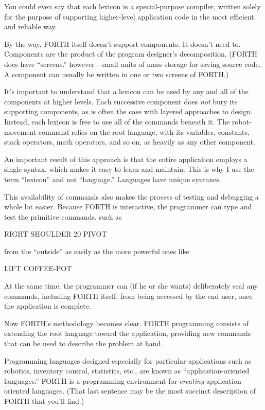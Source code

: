 You could even say that each lexicon is a special-purpose compiler,
written solely for the purpose of supporting higher-level application
code in the most efficient and reliable way.

By the way, FORTH itself doesn't support components. It doesn't need
to. Components are the product of the program designer's decomposition.
(FORTH does have {}``screens.'' however---small units of mass storage
for saving source code. A component can usually be written in one
or two screens of FORTH.)

It's important to understand that a lexicon can be used by any and
all of the components at higher levels. Each successive component
does \emph{not} bury its supporting components, as is often the case
with layered approaches to design. Instead, each lexicon is free to
use all of the commands beneath it. The robot-movement command relies
on the root language, with its variables, constants, stack operators,
math operators, and so on, as heavily as any other component.

An important result of this approach is that the entire application
employs a single syntax, which makes it easy to learn and maintain.
This is why I use the term {}``lexicon'' and not {}``language.''
Languages have unique syntaxes.

This availability of commands also makes the process of testing and
debugging a whole lot easier. Because FORTH is interactive, the programmer
can type and test the primitive commands, such as

\begin{Code}
RIGHT SHOULDER 20 PIVOT
\end{Code}
from the {}``outside'' as easily as the more powerful ones like

\begin{Code}
LIFT COFFEE-POT
\end{Code}
At the same time, the programmer can (if he or she wants) deliberately
seal any commands, including FORTH itself, from being accessed by
the end user, once the application is complete.

Now FORTH's methodology becomes clear. FORTH programming consists
of extending the root language toward the application, providing new
commands that can be used to describe the problem at hand.

Programming languages designed especially for particular applications
such as robotics, inventory control, statistics, etc., are known as
{}``application-oriented languages.'' FORTH is a programming environment
for \emph{creating} application-oriented languages. (That last sentence
may be the most succinct description of FORTH that you'll find.)

